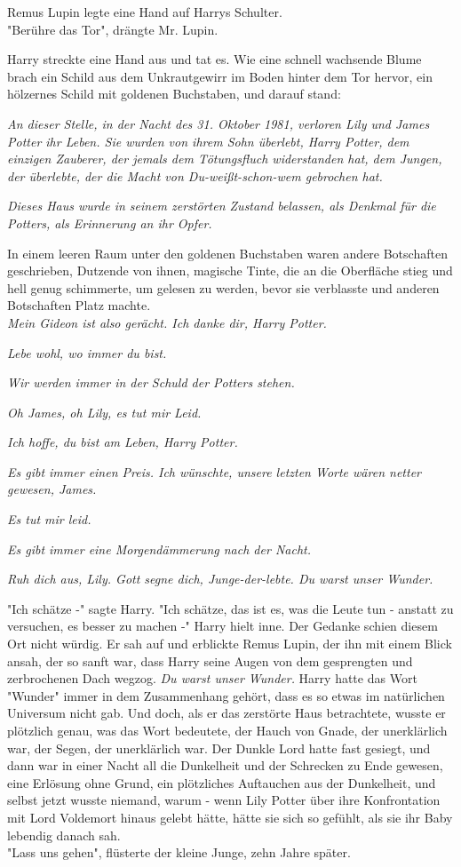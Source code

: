 {Remus Lupin legte eine Hand auf Harrys Schulter.\\ "Berühre das Tor", drängte Mr. Lupin.

Harry streckte eine Hand aus und tat es. Wie eine schnell wachsende Blume brach ein Schild aus dem Unkrautgewirr im Boden hinter dem Tor hervor, ein hölzernes Schild mit goldenen Buchstaben, und darauf stand:

\emph{An dieser Stelle, in der Nacht des 31. Oktober 1981, verloren Lily und James Potter ihr Leben. Sie wurden von ihrem Sohn überlebt, Harry Potter, dem einzigen Zauberer, der jemals dem Tötungsfluch widerstanden hat, dem Jungen, der überlebte, der die Macht von Du-weißt-schon-wem gebrochen hat.}

\emph{Dieses Haus wurde in seinem zerstörten Zustand belassen, als Denkmal für die Potters, als Erinnerung an ihr Opfer.}

In einem leeren Raum unter den goldenen Buchstaben waren andere Botschaften geschrieben, Dutzende von ihnen, magische Tinte, die an die Oberfläche stieg und hell genug schimmerte, um gelesen zu werden, bevor sie verblasste und anderen Botschaften Platz machte.\\ \emph{Mein Gideon ist also gerächt. Ich danke dir, Harry Potter.}

\emph{Lebe wohl, wo immer du bist.}

\emph{Wir werden immer in der Schuld der Potters stehen.}

\emph{Oh James, oh Lily, es tut mir Leid.}

\emph{Ich hoffe, du bist am Leben, Harry Potter.}

\emph{Es gibt immer einen Preis. Ich wünschte, unsere letzten Worte wären netter gewesen, James.}

\emph{Es tut mir leid.}

\emph{Es gibt immer eine Morgendämmerung nach der Nacht.}

\emph{Ruh dich aus, Lily. Gott segne dich, Junge-der-lebte. Du warst unser Wunder.}

"Ich schätze -" sagte Harry. "Ich schätze, das ist es, was die Leute tun - anstatt zu versuchen, es besser zu machen -" Harry hielt inne. Der Gedanke schien diesem Ort nicht würdig. Er sah auf und erblickte Remus Lupin, der ihn mit einem Blick ansah, der so sanft war, dass Harry seine Augen von dem gesprengten und zerbrochenen Dach wegzog. \emph{Du warst unser Wunder.} Harry hatte das Wort "Wunder" immer in dem Zusammenhang gehört, dass es so etwas im natürlichen Universum nicht gab. Und doch, als er das zerstörte Haus betrachtete, wusste er plötzlich genau, was das Wort bedeutete, der Hauch von Gnade, der unerklärlich war, der Segen, der unerklärlich war. Der Dunkle Lord hatte fast gesiegt, und dann war in einer Nacht all die Dunkelheit und der Schrecken zu Ende gewesen, eine Erlösung ohne Grund, ein plötzliches Auftauchen aus der Dunkelheit, und selbst jetzt wusste niemand, warum - wenn Lily Potter über ihre Konfrontation mit Lord Voldemort hinaus gelebt hätte, hätte sie sich so gefühlt, als sie ihr Baby lebendig danach sah.\\ "Lass uns gehen", flüsterte der kleine Junge, zehn Jahre später.

}
